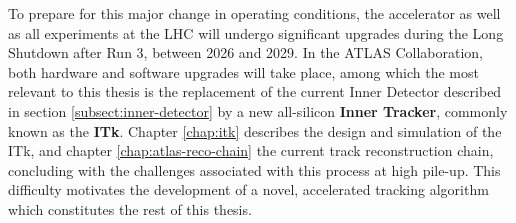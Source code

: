 To prepare for this major change in operating conditions, the accelerator as well as all experiments at the LHC will undergo significant upgrades during the Long Shutdown after Run 3, between 2026 and 2029. 
In the ATLAS Collaboration, both hardware and software upgrades will take place, among which the most relevant to this thesis is the replacement of the current Inner Detector described in section \ref{subsect:inner-detector} by a new all-silicon \textbf{Inner Tracker}, commonly known as the \textbf{ITk}. 
Chapter \ref{chap:itk} describes the design and simulation of the ITk, and chapter \ref{chap:atlas-reco-chain} the current track reconstruction chain, concluding with the challenges associated with this process at high pile-up. 
This difficulty motivates the development of a novel, accelerated tracking algorithm which constitutes the rest of this thesis.





